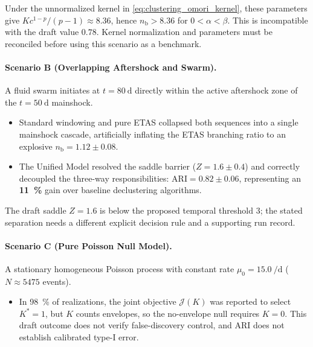 Under the unnormalized kernel in \cref{eq:clustering_omori_kernel},
these parameters give $Kc^{1-p}/(p-1)\approx8.36$, hence
$n_{\mathrm b}>8.36$ for $0<\alpha<\beta$. This is incompatible
with the draft value $0.78$. Kernel normalization and parameters
must be reconciled before using this scenario as a benchmark.

\paragraph{Scenario B (Overlapping Aftershock and Swarm).}
A fluid swarm initiates at $t = \qty{80}{\day}$ directly within the
active aftershock zone of the $t = \qty{50}{\day}$ mainshock.
\begin{itemize}[noitemsep]
  \item Standard windowing and pure \ac{ETAS} collapsed both
    sequences into a single mainshock cascade, artificially
    inflating the \ac{ETAS} branching ratio to an explosive
    $n_{\mathrm{b}} = \num{1.12} \pm \num{0.08}$.
  \item The Unified Model resolved the saddle barrier ($Z =
    \num{1.6} \pm \num{0.4}$) and correctly decoupled the three-way
    responsibilities: $\mathrm{ARI} = \num{0.82} \pm \num{0.06}$,
    representing an \textbf{\qty{+11}{\percent}} gain over baseline
    declustering
    algorithms.
\end{itemize}

The draft saddle $Z=1.6$ is below the proposed temporal threshold 3;
the stated separation needs a different explicit decision rule
and a supporting run record.

\paragraph{Scenario C (Pure Poisson Null Model).}
A stationary homogeneous Poisson process with constant rate $\mu_0 =
\qty{15.0}{\per\day}$ ($N \approx \num{5475}$ events).
\begin{itemize}[noitemsep]
  \item In \qty{98}{\percent} of realizations, the joint objective
    $\mathcal{J}(K)$ was reported to select $K^*=1$, but $K$ counts
    envelopes, so the no-envelope null requires $K=0$. This draft
    outcome does not verify false-discovery control, and ARI does
    not establish calibrated type-I error.
\end{itemize}

